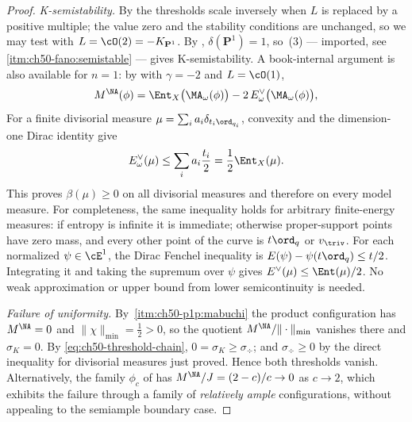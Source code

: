 \begin{proof}
\emph{K-semistability.}  By  the
thresholds scale inversely when $L$ is replaced by a positive multiple;
the value zero and the stability conditions are unchanged, so
we may test with $L=\cO(2)=-K_{\mathbf P^1}$.  By
, $\delta(\mathbf P^1)=1$, so
\,(3) --- imported, see
\,\cref{itm:ch50-fano:semistable} --- gives
K-semistability.  A book-internal argument is also available for
$n=1$: by  with $\gamma=-2$ and
$L=\cO(1)$,
\[
 M^{\NA}(\phi)=\Ent_X\bigl(\MA_\omega(\phi)\bigr)
   -2\,E^\vee_\omega\bigl(\MA_\omega(\phi)\bigr),
\]
For a finite divisorial measure $\mu=\sum_i a_i\delta_{t_i\ord_{q_i}}$,
convexity and the dimension-one Dirac identity give
\[
 E^\vee_\omega(\mu)\le\sum_i a_i\frac{t_i}{2}
       =\frac12\Ent_X(\mu).
\]
This proves $\beta(\mu)\ge0$ on all divisorial measures and therefore
on every model measure.  For completeness, the same inequality holds
for arbitrary finite-energy measures: if entropy is infinite it is
immediate; otherwise proper-support points have zero mass, and every
other point of the curve is $t\ord_q$ or $v_{\triv}$.
For each normalized $\psi\in\cE^1$, the Dirac Fenchel inequality is
$E(\psi)-\psi(t\ord_q)\le t/2$.  Integrating it and taking the
supremum over $\psi$ gives $E^\vee(\mu)\le\Ent(\mu)/2$.
No weak approximation or upper bound from lower semicontinuity is needed.

\emph{Failure of uniformity.}  By
\,\cref{itm:ch50-p1p:mabuchi} the product
configuration has $M^{\NA}=0$ and
$\|\chi\|_{\min}=\tfrac12>0$, so the quotient
$M^{\NA}/\|\cdot\|_{\min}$ vanishes there and
$\sigma_K=0$.  By \eqref{eq:ch50-threshold-chain},
$0=\sigma_K\ge\sigma_{\div}$; and $\sigma_{\div}\ge0$ by the direct inequality for divisorial
measures just proved.  Hence both thresholds vanish.  Alternatively, the family
$\phi_c$ of  has
$M^{\NA}/J=(2-c)/c\to0$ as $c\to2$, which exhibits the failure through
a family of \emph{relatively ample} configurations, without appealing to
the semiample boundary case.
\end{proof}

